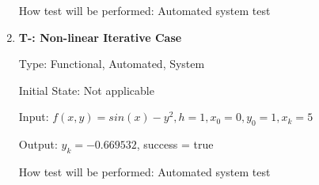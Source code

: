 \documentclass[12pt, titlepage]{article}
\newcounter{tnum} %
\begin{document}
\begin{enumerate}
How test will be performed: Automated system test

\item{\textbf{T-\thetnum \label{t-euler_nonlineariterative}: Non-linear Iterative Case}}

Type: Functional, Automated, System %
					
Initial State: Not applicable
					
Input: $f(x, y) = sin(x) - y^2, h = 1, x_0 = 0, y_0 = 1, x_k = 5$
					
Output: $y_k = -0.669532$, success = true
					
How test will be performed: Automated system test

\end{enumerate}
\end{document}
